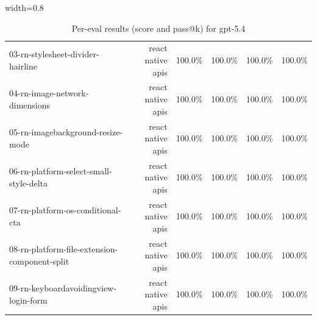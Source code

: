 \begin{table}[htbp]
\begin{adjustbox}{width=0.8\textwidth}
\begin{tabular}{lrrrrr}
03-rn-stylesheet-divider-hairline & react native apis & 100.0\% & 100.0\% & 100.0\% & 100.0\% \\
04-rn-image-network-dimensions & react native apis & 100.0\% & 100.0\% & 100.0\% & 100.0\% \\
05-rn-imagebackground-resize-mode & react native apis & 100.0\% & 100.0\% & 100.0\% & 100.0\% \\
06-rn-platform-select-small-style-delta & react native apis & 100.0\% & 100.0\% & 100.0\% & 100.0\% \\
07-rn-platform-os-conditional-cta & react native apis & 100.0\% & 100.0\% & 100.0\% & 100.0\% \\
08-rn-platform-file-extension-component-split & react native apis & 100.0\% & 100.0\% & 100.0\% & 100.0\% \\
09-rn-keyboardavoidingview-login-form & react native apis & 100.0\% & 100.0\% & 100.0\% & 100.0\% \\
\bottomrule
\end{tabular}
\end{adjustbox}
\caption{Per-eval results (score and pass@k) for gpt-5.4}
\end{table}
